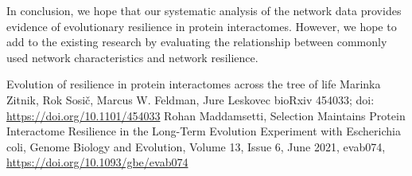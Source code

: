 \documentclass[12pt]{article}
\begin{document}
\indent In conclusion, we hope that our systematic analysis of the network data provides evidence of evolutionary resilience in protein interactomes. However, we hope to add to the existing research by evaluating the relationship between commonly used network characteristics and network resilience. 

\begin{thebibliography}{1}
  Evolution of resilience in protein interactomes across the tree of life
Marinka Zitnik, Rok Sosič, Marcus W. Feldman, Jure Leskovec
bioRxiv 454033; doi: \url{https://doi.org/10.1101/454033}
 Rohan Maddamsetti, Selection Maintains Protein Interactome Resilience in the Long-Term Evolution Experiment with Escherichia coli, Genome Biology and Evolution, Volume 13, Issue 6, June 2021, evab074, \url{https://doi.org/10.1093/gbe/evab074}
  \end{thebibliography}

\end{document}
